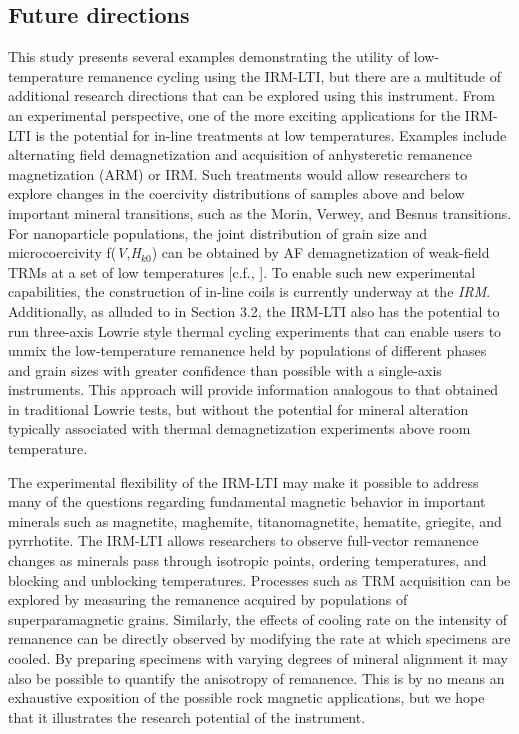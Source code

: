\documentclass[draft,gc]{AGUTeX}
\begin{document}
\begin{article}
\section{Future directions}

This study presents several examples demonstrating the utility of low-temperature remanence cycling using the IRM-LTI, but there are a multitude of additional research directions that can be explored using this instrument. From an experimental perspective, one of the more exciting applications for the IRM-LTI is the potential for in-line treatments at low temperatures. Examples include alternating field demagnetization and acquisition of anhysteretic remanence magnetization (ARM) or IRM. Such treatments would allow researchers to explore changes in the coercivity distributions of samples above and below important mineral transitions, such as the Morin, Verwey, and Besnus transitions. For nanoparticle populations, the joint distribution of grain size and microcoercivity f(\textit{V},\textit{H}$_{k0}$) can be obtained by AF demagnetization of weak-field TRMs at a set of low temperatures [c.f., \cite{Dunlop1969a}].  To enable such new experimental capabilities, the construction of in-line coils is currently underway at the \textit{IRM}. Additionally, as alluded to in Section 3.2, the IRM-LTI also has the potential to run three-axis Lowrie style thermal cycling experiments that can enable users to unmix the low-temperature remanence held by populations of different phases and grain sizes with greater confidence than possible with a single-axis instruments. This approach will provide information analogous to that obtained in traditional Lowrie tests, but without the potential for mineral alteration typically associated with thermal demagnetization experiments above room temperature.

The experimental flexibility of the IRM-LTI may make it possible to address many of the questions regarding fundamental magnetic behavior in important minerals such as magnetite, maghemite, titanomagnetite, hematite, griegite, and pyrrhotite. The IRM-LTI allows researchers to observe full-vector remanence changes as minerals pass through isotropic points, ordering temperatures, and blocking and unblocking temperatures. Processes such as TRM acquisition can be explored by measuring the remanence acquired by populations of superparamagnetic grains. Similarly, the effects of cooling rate on the intensity of remanence can be directly observed by modifying the rate at which specimens are cooled. By preparing specimens with varying degrees of mineral alignment it may also be possible to quantify the anisotropy of remanence. This is by no means an exhaustive exposition of the possible rock magnetic applications, but we hope that it illustrates the research potential of the instrument.     


\end{article}
\end{document}
